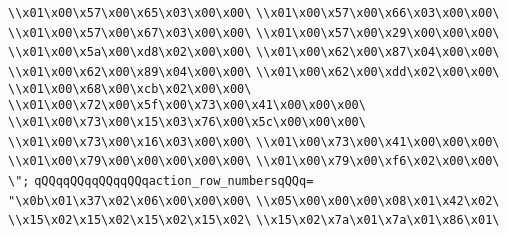 \verb|\\x01\x00\x57\x00\x65\x03\x00\x00\|\newline
\verb|\\x01\x00\x57\x00\x66\x03\x00\x00\|\newline
\verb|\\x01\x00\x57\x00\x67\x03\x00\x00\|\newline
\verb|\\x01\x00\x57\x00\x29\x00\x00\x00\|\newline
\verb|\\x01\x00\x5a\x00\xd8\x02\x00\x00\|\newline
\verb|\\x01\x00\x62\x00\x87\x04\x00\x00\|\newline
\verb|\\x01\x00\x62\x00\x89\x04\x00\x00\|\newline
\verb|\\x01\x00\x62\x00\xdd\x02\x00\x00\|\newline
\verb|\\x01\x00\x68\x00\xcb\x02\x00\x00\|\newline
\verb|\\x01\x00\x72\x00\x5f\x00\x73\x00\x41\x00\x00\x00\|\newline
\verb|\\x01\x00\x73\x00\x15\x03\x76\x00\x5c\x00\x00\x00\|\newline
\verb|\\x01\x00\x73\x00\x16\x03\x00\x00\|\newline
\verb|\\x01\x00\x73\x00\x41\x00\x00\x00\|\newline
\verb|\\x01\x00\x79\x00\x00\x00\x00\x00\|\newline
\verb|\\x01\x00\x79\x00\xf6\x02\x00\x00\|\newline
\verb|\";|\newline
\verb|qQQqqQQqqQQqqQQqaction_row_numbersqQQq=|\newline
\verb|"\x0b\x01\x37\x02\x06\x00\x00\x00\|\newline
\verb|\\x05\x00\x00\x00\x08\x01\x42\x02\|\newline
\verb|\\x15\x02\x15\x02\x15\x02\x15\x02\|\newline
\verb|\\x15\x02\x7a\x01\x7a\x01\x86\x01\|\newline
